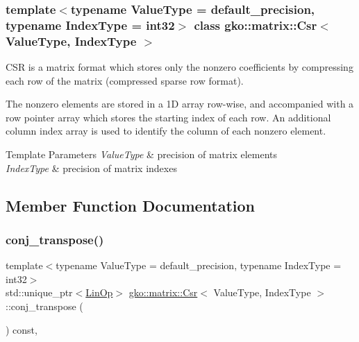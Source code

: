 \subsubsection*{template$<$typename Value\+Type = default\+\_\+precision, typename Index\+Type = int32$>$\newline
class gko\+::matrix\+::\+Csr$<$ Value\+Type, Index\+Type $>$}

C\+SR is a matrix format which stores only the nonzero coefficients by compressing each row of the matrix (compressed sparse row format). 

The nonzero elements are stored in a 1D array row-\/wise, and accompanied with a row pointer array which stores the starting index of each row. An additional column index array is used to identify the column of each nonzero element.


\begin{DoxyTemplParams}{Template Parameters}
{\em Value\+Type} & precision of matrix elements \\
\hline
{\em Index\+Type} & precision of matrix indexes \\
\hline
\end{DoxyTemplParams}


\subsection{Member Function Documentation}
\mbox{\label{classgko_1_1matrix_1_1Csr_a38820451af5424f18b767667f3067d72}} 
\subsubsection{\texorpdfstring{conj\+\_\+transpose()}{conj\_transpose()}}
{\footnotesize\ttfamily template$<$typename Value\+Type = default\+\_\+precision, typename Index\+Type = int32$>$ \\
std\+::unique\+\_\+ptr$<$\hyperlink{classgko_1_1LinOp}{Lin\+Op}$>$ \hyperlink{classgko_1_1matrix_1_1Csr}{gko\+::matrix\+::\+Csr}$<$ Value\+Type, Index\+Type $>$\+::conj\+\_\+transpose (\begin{DoxyParamCaption}{ }\end{DoxyParamCaption}) const\hspace{0.3cm}{\ttfamily [override]}, {\ttfamily [virtual]}}



